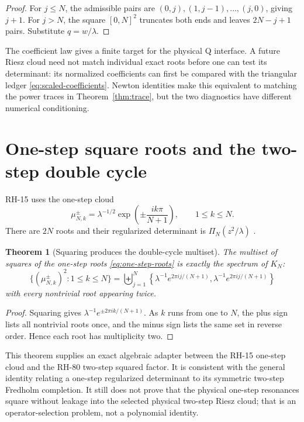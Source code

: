 \documentclass[12pt]{article}
\newtheorem{theorem}{Theorem}[section]
\theoremstyle{remark}
\begin{document}
\begin{proof}
For $j\le N$, the admissible pairs are
$(0,j),(1,j-1),\ldots,(j,0)$, giving $j+1$.  For $j>N$, the square
$[0,N]^2$ truncates both ends and leaves $2N-j+1$ pairs.  Substitute
$q=w/\lambda$.
\end{proof}

The coefficient law gives a finite target for the physical Q interface.  A
future Riesz cloud need not match individual exact roots before one can test
its determinant: its normalized coefficients can first be compared with the
triangular ledger \eqref{eq:scaled-coefficients}.  Newton identities make this
equivalent to matching the power traces in Theorem~\ref{thm:trace}, but the
two diagnostics have different numerical conditioning.

\section{One-step square roots and the two-step double cycle}

RH-15 uses the one-step cloud
\begin{equation}\label{eq:one-step-roots}
 \mu_{N,k}^{\pm}=\lambda^{-1/2}
 \exp\left(\pm\frac{ik\pi}{N+1}\right),
 \qquad 1\le k\le N.
\end{equation}
There are $2N$ roots and their regularized determinant is
$\Pi_N(z^2/\lambda)$ \citep{WangRH15}.

\begin{theorem}[Squaring produces the double-cycle multiset]
\label{thm:squaring}
The multiset of squares of the one-step roots
\eqref{eq:one-step-roots} is exactly the spectrum of $K_N$:
\begin{equation}\label{eq:squared-roots}
 \{(\mu_{N,k}^{\pm})^2:1\le k\le N\}
 =\biguplus_{j=1}^N
 \left\{\lambda^{-1}e^{2\pi ij/(N+1)},
 \lambda^{-1}e^{2\pi ij/(N+1)}\right\}
\end{equation}
with every nontrivial root appearing twice.
\end{theorem}

\begin{proof}
Squaring gives
$\lambda^{-1}e^{\pm2\pi ik/(N+1)}$.  As $k$ runs from one to $N$, the plus
sign lists all nontrivial roots once, and the minus sign lists the same set in
reverse order.  Hence each root has multiplicity two.
\end{proof}

This theorem supplies an exact algebraic adapter between the RH-15 one-step
cloud and the RH-80 two-step squared factor.  It is consistent with the
general identity relating a one-step regularized determinant to its symmetric
two-step Fredholm completion.  It still does not prove that the physical
one-step resonances square without leakage into the selected physical
two-step Riesz cloud; that is an operator-selection problem, not a polynomial
identity.
\end{document}
